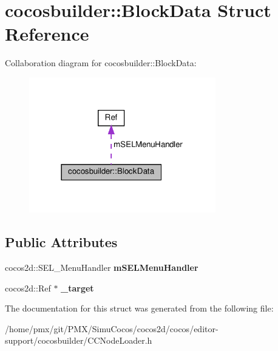 \hypertarget{structcocosbuilder_1_1BlockData}{}\section{cocosbuilder\+:\+:Block\+Data Struct Reference}
\label{structcocosbuilder_1_1BlockData}


Collaboration diagram for cocosbuilder\+:\+:Block\+Data\+:
\nopagebreak
\begin{figure}[H]
\begin{center}
\leavevmode
\includegraphics[width=230pt]{structcocosbuilder_1_1BlockData__coll__graph}
\end{center}
\end{figure}
\subsection*{Public Attributes}
\begin{DoxyCompactItemize}
\item 
\mbox{\label{structcocosbuilder_1_1BlockData_a04630094eafb868a04bd8effa01099d9}} 
cocos2d\+::\+S\+E\+L\+\_\+\+Menu\+Handler {\bfseries m\+S\+E\+L\+Menu\+Handler}
\item 
\mbox{\label{structcocosbuilder_1_1BlockData_a4c6dab80cb99cab2f73e0a5efc8f52e8}} 
cocos2d\+::\+Ref $\ast$ {\bfseries \+\_\+target}
\end{DoxyCompactItemize}


The documentation for this struct was generated from the following file\+:\begin{DoxyCompactItemize}
\item 
/home/pmx/git/\+P\+M\+X/\+Simu\+Cocos/cocos2d/cocos/editor-\/support/cocosbuilder/C\+C\+Node\+Loader.\+h\end{DoxyCompactItemize}
